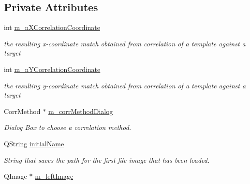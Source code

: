 \subsection*{Private Attributes}
\begin{CompactItemize}
\item 
\hypertarget{classQcorr_53798525ce189307cf597e71aabca91b}{
int \hyperlink{classQcorr_53798525ce189307cf597e71aabca91b}{m\_\-nXCorrelationCoordinate}}
\label{classQcorr_53798525ce189307cf597e71aabca91b}

\begin{CompactList}\small\item\em the resulting x-coordinate match obtained from correlation of a template against a target \item\end{CompactList}\item 
\hypertarget{classQcorr_29f34cc7b765d5a64856696c48bfc191}{
int \hyperlink{classQcorr_29f34cc7b765d5a64856696c48bfc191}{m\_\-nYCorrelationCoordinate}}
\label{classQcorr_29f34cc7b765d5a64856696c48bfc191}

\begin{CompactList}\small\item\em the resulting y-coordinate match obtained from correlation of a template against a target \item\end{CompactList}\item 
\hypertarget{classQcorr_6509fcbf4cd8925aa109cc53e638b69a}{
CorrMethod $\ast$ \hyperlink{classQcorr_6509fcbf4cd8925aa109cc53e638b69a}{m\_\-corrMethodDialog}}
\label{classQcorr_6509fcbf4cd8925aa109cc53e638b69a}

\begin{CompactList}\small\item\em Dialog Box to choose a correlation method. \item\end{CompactList}\item 
\hypertarget{classQcorr_3430716ddbe203f677095c163da87f86}{
QString \hyperlink{classQcorr_3430716ddbe203f677095c163da87f86}{initialName}}
\label{classQcorr_3430716ddbe203f677095c163da87f86}

\begin{CompactList}\small\item\em String that saves the path for the first file image that has been loaded. \item\end{CompactList}\item 
\hypertarget{classQcorr_e8bdd4be8a0c3023be34a1301b28c913}{
QImage $\ast$ \hyperlink{classQcorr_e8bdd4be8a0c3023be34a1301b28c913}{m\_\-leftImage}}
\label{classQcorr_e8bdd4be8a0c3023be34a1301b28c913}


\end{CompactItemize}
